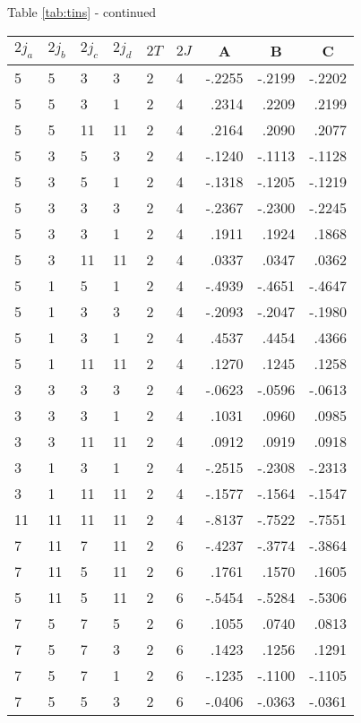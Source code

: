 \begin{center}{Table \ref{tab:tins} - continued}\end{center}
\clearpage
\small
\begin{center}
\begin{tabular}{llllllrrr}
\hline
$2j_{a}$&$2j_{b}$&$2j_{c}$&$2j_{d}$&$2T$&$2J$&
\multicolumn{1}{c}{A}&
\multicolumn{1}{c}{B}&
\multicolumn{1}{c}{C}
\\\hline
  5& 5& 3& 3& 2& 4&  -.2255&  -.2199&  -.2202\\
  5& 5& 3& 1& 2& 4&   .2314&   .2209&   .2199\\
  5& 5&11&11& 2& 4&   .2164&   .2090&   .2077\\
  5& 3& 5& 3& 2& 4&  -.1240&  -.1113&  -.1128\\
  5& 3& 5& 1& 2& 4&  -.1318&  -.1205&  -.1219\\
  5& 3& 3& 3& 2& 4&  -.2367&  -.2300&  -.2245\\
  5& 3& 3& 1& 2& 4&   .1911&   .1924&   .1868\\
  5& 3&11&11& 2& 4&   .0337&   .0347&   .0362\\
  5& 1& 5& 1& 2& 4&  -.4939&  -.4651&  -.4647\\
  5& 1& 3& 3& 2& 4&  -.2093&  -.2047&  -.1980\\
  5& 1& 3& 1& 2& 4&   .4537&   .4454&   .4366\\
  5& 1&11&11& 2& 4&   .1270&   .1245&   .1258\\
  3& 3& 3& 3& 2& 4&  -.0623&  -.0596&  -.0613\\
  3& 3& 3& 1& 2& 4&   .1031&   .0960&   .0985\\
  3& 3&11&11& 2& 4&   .0912&   .0919&   .0918\\
  3& 1& 3& 1& 2& 4&  -.2515&  -.2308&  -.2313\\
  3& 1&11&11& 2& 4&  -.1577&  -.1564&  -.1547\\
 11&11&11&11& 2& 4&  -.8137&  -.7522&  -.7551\\
  7&11& 7&11& 2& 6&  -.4237&  -.3774&  -.3864\\
  7&11& 5&11& 2& 6&   .1761&   .1570&   .1605\\
  5&11& 5&11& 2& 6&  -.5454&  -.5284&  -.5306\\
  7& 5& 7& 5& 2& 6&   .1055&   .0740&   .0813\\
  7& 5& 7& 3& 2& 6&   .1423&   .1256&   .1291\\
  7& 5& 7& 1& 2& 6&  -.1235&  -.1100&  -.1105\\
  7& 5& 5& 3& 2& 6&  -.0406&  -.0363&  -.0361\\
\hline
\end{tabular}
\end{center}
